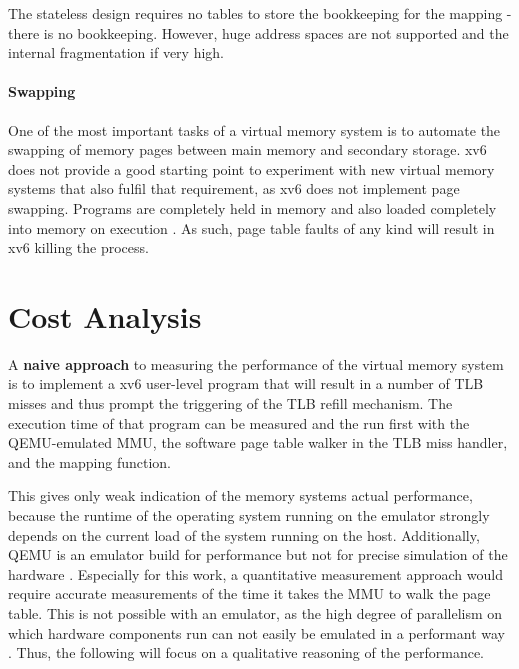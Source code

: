 The stateless design requires no tables to store the bookkeeping for the mapping - there is no bookkeeping. However, huge address spaces are not supported and the internal fragmentation if very high.

\paragraph{Swapping} One of the most important tasks of a virtual memory system is to automate the swapping of memory pages between main memory and secondary storage. xv6 does not provide a good starting point to experiment with new virtual memory systems that also fulfil that requirement, as xv6 does not implement page swapping. Programs are completely held in memory and also loaded completely into memory on execution \cite{cox2011xv6}. As such, page table faults of any kind will result in xv6 killing the process.




\section{Cost Analysis}

A \textbf{naive approach} to measuring the performance of the virtual memory system is to implement a xv6 user-level program that will result in a number of TLB misses and thus prompt the triggering of the TLB refill mechanism. The execution time of that program can be measured and the run first with the QEMU-emulated MMU, the software page table walker in the TLB miss handler, and the mapping function.

This gives only weak indication of the memory systems actual performance, because the runtime of the operating system running on the emulator strongly depends on the current load of the system running on the host. Additionally, QEMU is an emulator build for performance but not for precise simulation of the hardware \cite{bellard2005qemu}. Especially for this work, a quantitative measurement approach would require accurate measurements of the time it takes the MMU to walk the page table. This is not possible with an emulator, as the high degree of parallelism on which hardware components run can not easily be emulated in a performant way \cite{chen2010emulator}. Thus, the following will focus on a qualitative reasoning of the performance.

